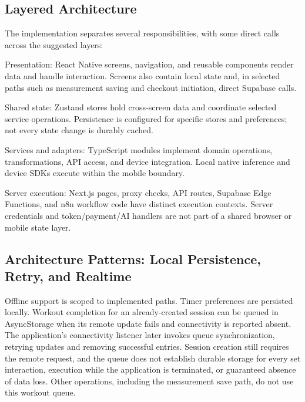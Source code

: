 \documentclass[12pt,a4paper,openany]{report}
\begin{document}
\subsection{Layered Architecture}

The implementation separates several responsibilities, with some direct calls across the suggested layers:

\noindent\textbullet\enspace Presentation: React Native screens, navigation, and reusable components render data and handle interaction. Screens also contain local state and, in selected paths such as measurement saving and checkout initiation, direct Supabase calls.\par

\noindent\textbullet\enspace Shared state: Zustand stores hold cross-screen data and coordinate selected service operations. Persistence is configured for specific stores and preferences; not every state change is durably cached.\par

\noindent\textbullet\enspace Services and adapters: TypeScript modules implement domain operations, transformations, API access, and device integration. Local native inference and device SDKs execute within the mobile boundary.\par

\noindent\textbullet\enspace Server execution: Next.js pages, proxy checks, API routes, Supabase Edge Functions, and n8n workflow code have distinct execution contexts. Server credentials and token/payment/AI handlers are not part of a shared browser or mobile state layer.\par

\subsection{Architecture Patterns: Local Persistence, Retry, and Realtime}

Offline support is scoped to implemented paths. Timer preferences are persisted locally. Workout completion for an already-created session can be queued in AsyncStorage when its remote update fails and connectivity is reported absent. The application's connectivity listener later invokes queue synchronization, retrying updates and removing successful entries. Session creation still requires the remote request, and the queue does not establish durable storage for every set interaction, execution while the application is terminated, or guaranteed absence of data loss. Other operations, including the measurement save path, do not use this workout queue.
\end{document}
